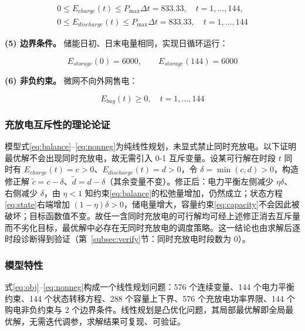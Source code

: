 \documentclass[zihao=-4,a4paper,UTF8,fontset=none]{ctexart}
\begin{document}
\begin{equation}
  \begin{split}
    0 \le E_{charge}(t) \le P_{\max}\Delta t = 833.33,\quad t=1,\ldots,144,\\
    0 \le E_{discharge}(t) \le P_{\max}\Delta t = 833.33,\quad t=1,\ldots,144
  \end{split}
  \label{eq:power}
\end{equation}

\textbf{(5) 边界条件。} 储能日初、日末电量相同，实现日循环运行：

\begin{equation}
  E_{storage}(0) = 6000,\qquad E_{storage}(144) = 6000
  \label{eq:boundary}
\end{equation}

\textbf{(6) 非负约束。} 微网不向外网售电：

\begin{equation}
  E_{buy}(t) \ge 0,\quad t=1,\ldots,144
  \label{eq:nonneg}
\end{equation}

\subsubsection{充放电互斥性的理论论证}

模型式\eqref{eq:balance}--\eqref{eq:nonneg}为纯线性规划，未显式禁止同时充放电。以下证明最优解不会出现同时充放电，故无需引入 0-1 互斥变量。设某可行解在时段 $t$ 同时有 $E_{charge}(t)=c>0$、$E_{discharge}(t)=d>0$，令 $\delta=\min(c,d)>0$，构造修正解 $\tilde c=c-\delta$、$\tilde d=d-\delta$（其余变量不变）。修正后：电力平衡左侧减少 $\eta\delta$、右侧减少 $\delta$，由 $\eta<1$ 知约束\eqref{eq:balance}的松弛量增加，仍然成立；状态方程\eqref{eq:state}右端增加 $(1-\eta)\delta>0$，储电量增大，容量约束\eqref{eq:capacity}不会因此被破坏；目标函数值不变。故任一含同时充放电的可行解均可经上述修正消去互斥量而不劣化目标，最优解中必存在无同时充放电的调度策略。这一结论也由求解后逐时段诊断得到验证（第~\ref{subsec:verify}节：同时充放电时段数为 0）。

\subsubsection{模型特性}

式\eqref{eq:obj}--\eqref{eq:nonneg}构成一个线性规划问题：576 个连续变量、144 个电力平衡约束、144 个状态转移方程、288 个容量上下界、576 个充放电功率界限、144 个购电非负约束与 2 个边界条件。线性规划是凸优化问题，其局部最优解即全局最优解，无需迭代调参，求解结果可复现、可验证。
\end{document}
